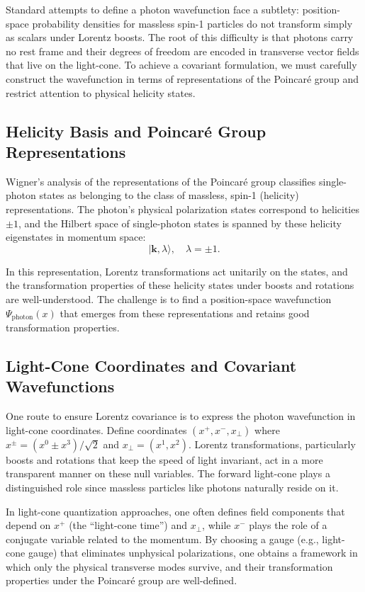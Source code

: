 \documentclass[aps,prl,twocolumn,showpacs,showkeys,superscriptaddress,amsmath,amssymb]{revtex4-2}
\begin{document}
Standard attempts to define a photon wavefunction face a subtlety: position-space probability densities for massless spin-1 particles do not transform simply as scalars under Lorentz boosts. The root of this difficulty is that photons carry no rest frame and their degrees of freedom are encoded in transverse vector fields that live on the light-cone. To achieve a covariant formulation, we must carefully construct the wavefunction in terms of representations of the Poincaré group and restrict attention to physical helicity states.

\subsection{Helicity Basis and Poincaré Group Representations}

Wigner’s analysis of the representations of the Poincaré group classifies single-photon states as belonging to the class of massless, spin-1 (helicity) representations. The photon’s physical polarization states correspond to helicities $\pm 1$, and the Hilbert space of single-photon states is spanned by these helicity eigenstates in momentum space:
\begin{equation}
| \mathbf{k}, \lambda \rangle, \quad \lambda = \pm 1.
\end{equation}

In this representation, Lorentz transformations act unitarily on the states, and the transformation properties of these helicity states under boosts and rotations are well-understood. The challenge is to find a position-space wavefunction $\Psi_{\text{photon}}(x)$ that emerges from these representations and retains good transformation properties.

\subsection{Light-Cone Coordinates and Covariant Wavefunctions}

One route to ensure Lorentz covariance is to express the photon wavefunction in light-cone coordinates. Define coordinates $(x^+, x^-, x_\perp)$ where $x^\pm = (x^0 \pm x^3)/\sqrt{2}$ and $x_\perp = (x^1, x^2)$. Lorentz transformations, particularly boosts and rotations that keep the speed of light invariant, act in a more transparent manner on these null variables. The forward light-cone plays a distinguished role since massless particles like photons naturally reside on it.

In light-cone quantization approaches, one often defines field components that depend on $x^+$ (the “light-cone time”) and $x_\perp$, while $x^-$ plays the role of a conjugate variable related to the momentum. By choosing a gauge (e.g., light-cone gauge) that eliminates unphysical polarizations, one obtains a framework in which only the physical transverse modes survive, and their transformation properties under the Poincaré group are well-defined.
\end{document}
